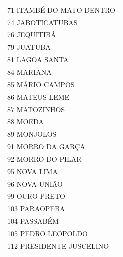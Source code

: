 \documentclass{article}
\begin{document}
\begin{longtable}[c]{m{18cm}}
\multicolumn{1}{l}{ \hspace{2em} 71 ITAMBÉ DO MATO DENTRO } \\
\multicolumn{1}{l}{ \hspace{2em} 74 JABOTICATUBAS } \\
\multicolumn{1}{l}{ \hspace{2em} 76 JEQUITIBÁ } \\
\multicolumn{1}{l}{ \hspace{2em} 79 JUATUBA } \\
\multicolumn{1}{l}{ \hspace{2em} 81 LAGOA SANTA } \\
\multicolumn{1}{l}{ \hspace{2em} 84 MARIANA } \\
\multicolumn{1}{l}{ \hspace{2em} 85 MÁRIO CAMPOS } \\
\multicolumn{1}{l}{ \hspace{2em} 86 MATEUS LEME } \\
\multicolumn{1}{l}{ \hspace{2em} 87 MATOZINHOS } \\
\multicolumn{1}{l}{ \hspace{2em} 88 MOEDA } \\
\multicolumn{1}{l}{ \hspace{2em} 89 MONJOLOS } \\
\multicolumn{1}{l}{ \hspace{2em} 91 MORRO DA GARÇA } \\
\multicolumn{1}{l}{ \hspace{2em} 92 MORRO DO PILAR } \\
\multicolumn{1}{l}{ \hspace{2em} 95 NOVA LIMA } \\
\multicolumn{1}{l}{ \hspace{2em} 96 NOVA UNIÃO } \\
\multicolumn{1}{l}{ \hspace{2em} 99 OURO PRETO } \\
\multicolumn{1}{l}{ \hspace{2em} 103 PARAOPEBA } \\
\multicolumn{1}{l}{ \hspace{2em} 104 PASSABÉM } \\
\multicolumn{1}{l}{ \hspace{2em} 105 PEDRO LEOPOLDO } \\
\multicolumn{1}{l}{ \hspace{2em} 112 PRESIDENTE JUSCELINO } \\

\end{longtable}
\end{document}
